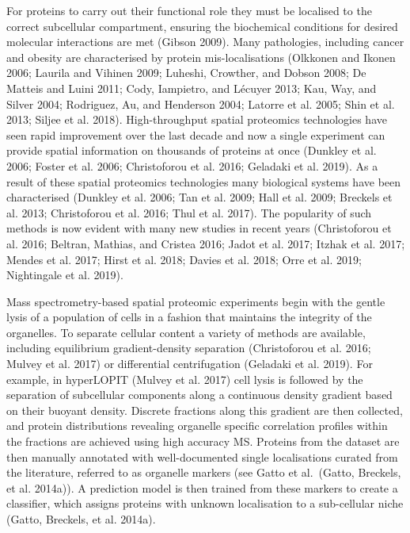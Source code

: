 \documentclass[
]{article}
\begin{document}
For proteins to carry out their functional role they must be localised
to the correct subcellular compartment, ensuring the biochemical
conditions for desired molecular interactions are met (Gibson 2009).
Many pathologies, including cancer and obesity are characterised by
protein mis-localisations (Olkkonen and Ikonen 2006; Laurila and Vihinen
2009; Luheshi, Crowther, and Dobson 2008; De Matteis and Luini 2011;
Cody, Iampietro, and Lécuyer 2013; Kau, Way, and Silver 2004; Rodriguez,
Au, and Henderson 2004; Latorre et al. 2005; Shin et al. 2013; Siljee et
al. 2018). High-throughput spatial proteomics technologies have seen
rapid improvement over the last decade and now a single experiment can
provide spatial information on thousands of proteins at once (Dunkley et
al. 2006; Foster et al. 2006; Christoforou et al. 2016; Geladaki et al.
2019). As a result of these spatial proteomics technologies many
biological systems have been characterised (Dunkley et al. 2006; Tan et
al. 2009; Hall et al. 2009; Breckels et al. 2013; Christoforou et al.
2016; Thul et al. 2017). The popularity of such methods is now evident
with many new studies in recent years (Christoforou et al. 2016;
Beltran, Mathias, and Cristea 2016; Jadot et al. 2017; Itzhak et al.
2017; Mendes et al. 2017; Hirst et al. 2018; Davies et al. 2018; Orre et
al. 2019; Nightingale et al. 2019).

Mass spectrometry-based spatial proteomic experiments begin with the
gentle lysis of a population of cells in a fashion that maintains the
integrity of the organelles. To separate cellular content a variety of
methods are available, including equilibrium gradient-density separation
(Christoforou et al. 2016; Mulvey et al. 2017) or differential
centrifugation (Geladaki et al. 2019). For example, in hyperLOPIT
(Mulvey et al. 2017) cell lysis is followed by the separation of
subcellular components along a continuous density gradient based on
their buoyant density. Discrete fractions along this gradient are then
collected, and protein distributions revealing organelle specific
correlation profiles within the fractions are achieved using high
accuracy MS. Proteins from the dataset are then manually annotated with
well-documented single localisations curated from the literature,
referred to as organelle markers (see Gatto et al.~(Gatto, Breckels, et
al. 2014a)). A prediction model is then trained from these markers to
create a classifier, which assigns proteins with unknown localisation to
a sub-cellular niche (Gatto, Breckels, et al. 2014a).
\end{document}
